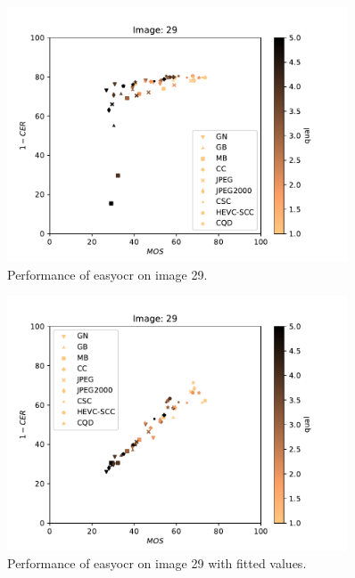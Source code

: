 \begin{figure}[h]
\centering
\includegraphics[width=0.9\textwidth]{../../images/analyze/mos_ter_ezocr_img29.pdf}
\caption{Performance of easyocr on image 29.}
\label{fig:img29}
\end{figure}

\begin{figure}[h]
\centering
\includegraphics[width=0.9\textwidth]{../../images/analyze/mos_ter_fit_ezocr_img29.pdf}
\caption{Performance of easyocr on image 29 with fitted values.}
\label{fig:img29_fit}
\end{figure}

